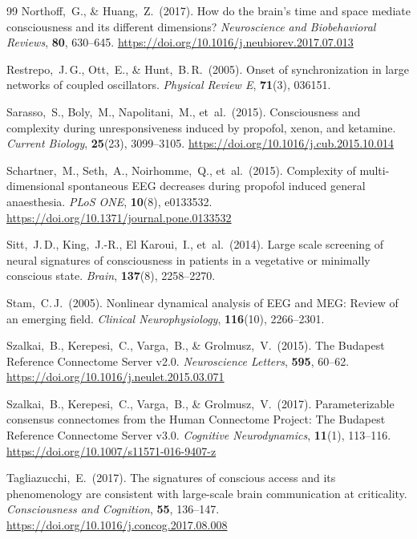 \documentclass[11pt,a4paper]{article}
\theoremstyle{plain}
\theoremstyle{definition}
\theoremstyle{remark}
\begin{document}
\begin{thebibliography}{99}
Northoff,~G., \& Huang,~Z.\ (2017).
How do the brain's time and space mediate consciousness and its different dimensions?
\textit{Neuroscience and Biobehavioral Reviews}, \textbf{80}, 630--645.
\url{https://doi.org/10.1016/j.neubiorev.2017.07.013}

Restrepo,~J.\,G., Ott,~E., \& Hunt,~B.\,R.\ (2005).
Onset of synchronization in large networks of coupled oscillators.
\textit{Physical Review E}, \textbf{71}(3), 036151.

Sarasso,~S., Boly,~M., Napolitani,~M., et~al.\ (2015).
Consciousness and complexity during unresponsiveness induced by propofol, xenon, and ketamine.
\textit{Current Biology}, \textbf{25}(23), 3099--3105.
\url{https://doi.org/10.1016/j.cub.2015.10.014}

Schartner,~M., Seth,~A., Noirhomme,~Q., et~al.\ (2015).
Complexity of multi-dimensional spontaneous EEG decreases during propofol induced general anaesthesia.
\textit{PLoS ONE}, \textbf{10}(8), e0133532.
\url{https://doi.org/10.1371/journal.pone.0133532}

Sitt,~J.\,D., King,~J.-R., El Karoui,~I., et~al.\ (2014).
Large scale screening of neural signatures of consciousness in patients in a vegetative or minimally conscious state.
\textit{Brain}, \textbf{137}(8), 2258--2270.

Stam,~C.\,J.\ (2005).
Nonlinear dynamical analysis of EEG and MEG: Review of an emerging field.
\textit{Clinical Neurophysiology}, \textbf{116}(10), 2266--2301.

Szalkai,~B., Kerepesi,~C., Varga,~B., \& Grolmusz,~V.\ (2015).
The Budapest Reference Connectome Server v2.0.
\textit{Neuroscience Letters}, \textbf{595}, 60--62.
\url{https://doi.org/10.1016/j.neulet.2015.03.071}

Szalkai,~B., Kerepesi,~C., Varga,~B., \& Grolmusz,~V.\ (2017).
Parameterizable consensus connectomes from the Human Connectome Project: The Budapest Reference Connectome Server v3.0.
\textit{Cognitive Neurodynamics}, \textbf{11}(1), 113--116.
\url{https://doi.org/10.1007/s11571-016-9407-z}

Tagliazucchi,~E.\ (2017).
The signatures of conscious access and its phenomenology are consistent with large-scale brain communication at criticality.
\textit{Consciousness and Cognition}, \textbf{55}, 136--147.
\url{https://doi.org/10.1016/j.concog.2017.08.008}


\end{thebibliography}
\end{document}
